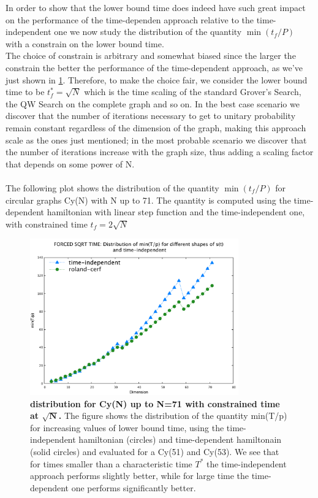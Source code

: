         In order to show that the lower bound time does indeed have such great impact on the performance of the time-dependen approach relative to the time-independent one we now study the distribution of the quantity $\min(t_f/P)$ with a constrain on the lower bound time. \\ The choice of constrain is arbitrary and somewhat biased since the larger the constrain the better the performance of the time-dependent approach, as we've just shown in \cref{fig:delta_increasing_time}. Therefore, to make the choice fair, we consider the lower bound time to be $t_f^* = \sqrt{N}$ which is the time scaling of the standard Grover's Search, the QW Search on the complete graph and so on. In the best case scenario we discover that the number of iterations necessary to get to unitary probability remain constant regardless of the dimension of the graph, making this approach scale as the ones just mentioned; in the most probable scenario we discover that the number of iterations increase with the graph size, thus adding a scaling factor that depends on some power of N. \\ \\ The following plot shows the distribution of the quantity $\min(t_f/P)$ for circular graphs Cy(N) with N up to 71. The quantity is computed using the time-dependent hamiltonian with linear step function and the time-independent one, with constrained time $t_f=2 \sqrt{N}$
        \begin{figure}[ht]
        \centering
        \includegraphics[width=90mm]{./figures/min_tp_sqrt/forced_delta.pdf}
        \caption[$\min(t_f/P)$ distribution for Cy(N) up to N=71 with constrained time at $\sqrt(N)$.]{\textbf{ distribution for Cy(N) up to N=71 with constrained time at $\bm{\sqrt{N}}$.} The figure shows the distribution of the quantity min(T/p) for increasing values of lower bound time, using the time-independent hamiltonian (circles) and time-dependent hamiltonain (solid circles) and evaluated for a Cy(51) and Cy(53). We see that for times smaller than a characteristic time $T^*$ the time-independent approach performs slightly better, while for large time the time-dependent one performs significantly better. }
        \label{fig:delta_increasing_time}
        \end{figure}\\ \\
